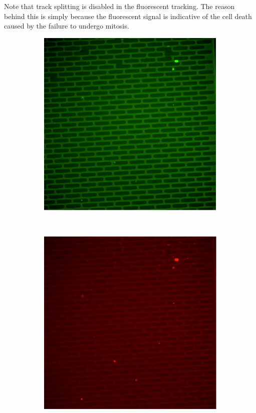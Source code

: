 \documentclass[pdftex,12pt,a4paper]{report}
\begin{document}
Note that track splitting is disabled in the fluorescent tracking. The reason behind this is simply because the fluorescent signal is indicative of the cell death caused by the failure to undergo mitosis.

\begin{figure}[H]

\centering

\begin{subfigure}{0.3\textwidth}
  \centering
  \includegraphics[width=\textwidth]{images/caspase_onset_sample}
  \caption{}
  \label{fig:caspase_onset_sample}
\end{subfigure}%
~
\begin{subfigure}{0.3\textwidth}
  \centering
  \includegraphics[width=\textwidth]{images/pi_onset_sample}
  \caption{}
  \label{fig:pi_onset_sample}
\end{subfigure}%


\end{figure}
\end{document}
